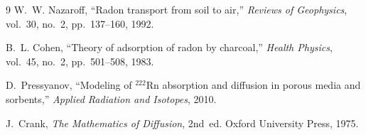 \documentclass[11pt,a4paper]{article}
\begin{document}
\begin{thebibliography}{9}
W.~W. Nazaroff, ``Radon transport from soil to air,'' \emph{Reviews of Geophysics}, vol.~30, no.~2, pp.~137--160, 1992.

B.~L. Cohen, ``Theory of adsorption of radon by charcoal,'' \emph{Health Physics}, vol.~45, no.~2, pp.~501--508, 1983.

D.~Pressyanov, ``Modeling of $^{222}\text{Rn}$ absorption and diffusion in porous media and sorbents,'' \emph{Applied Radiation and Isotopes}, 2010.

J.~Crank, \emph{The Mathematics of Diffusion}, 2nd~ed. Oxford University Press, 1975.
\end{thebibliography}
\end{document}
